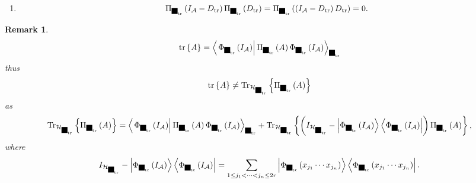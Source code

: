 \documentclass[aps,preprint]{revtex4}%
\providecommand{\U}[1]{\protect\rule{.1in}{.1in}}
\newtheorem{remark}[theorem]{Remark}
\begin{document}
\begin{enumerate}
\item
\begin{equation}
\Pi_{\U{3c6} _{\operatorname*{tr}}}\left(  I_{\mathcal{A}}%
-D_{\operatorname*{tr}}\right)  \Pi_{\U{3c6} _{\operatorname*{tr}}}\left(
D_{\operatorname*{tr}}\right)  =\Pi_{\U{3c6} _{\operatorname*{tr}}}\left(
\left(  I_{\mathcal{A}}-D_{\operatorname*{tr}}\right)  D_{\operatorname*{tr}%
}\right)  =0.
\end{equation}

\end{enumerate}

\begin{remark}%
\begin{equation}
\operatorname*{tr}\left\{  A\right\}  =\left\langle \left.  \Phi_{\U{3c6}
_{\operatorname*{tr}}}\left(  I_{\mathcal{A}}\right)  \right\vert \Pi_{\U{3c6}
_{\operatorname*{tr}}}\left(  A\right)  \Phi_{\U{3c6} _{\operatorname*{tr}}%
}\left(  I_{\mathcal{A}}\right)  \right\rangle _{\U{3c6} _{\operatorname*{tr}%
}}%
\end{equation}
thus
\begin{equation}
\operatorname*{tr}\left\{  A\right\}  \neq\operatorname{Tr}_{\mathcal{H}%
_{\U{3c6} _{\operatorname*{tr}}}}\left\{  \Pi_{\U{3c6} _{\operatorname*{tr}}%
}\left(  A\right)  \right\}
\end{equation}
as
\begin{equation}
\operatorname{Tr}_{\mathcal{H}_{\U{3c6} _{\operatorname*{tr}}}}\left\{
\Pi_{\U{3c6} _{\operatorname*{tr}}}\left(  A\right)  \right\}  =\left\langle
\left.  \Phi_{\U{3c6} _{\operatorname*{tr}}}\left(  I_{\mathcal{A}}\right)
\right\vert \Pi_{\U{3c6} _{\operatorname*{tr}}}\left(  A\right)  \Phi_{\U{3c6}
_{\operatorname*{tr}}}\left(  I_{\mathcal{A}}\right)  \right\rangle _{\U{3c6}
_{\operatorname*{tr}}}+\operatorname{Tr}_{\mathcal{H}_{\U{3c6}
_{\operatorname*{tr}}}}\left\{  \left(  I_{\mathcal{H}_{\U{3c6}
_{\operatorname*{tr}}}}-\left\vert \Phi_{\U{3c6} _{\operatorname*{tr}}}\left(
I_{\mathcal{A}}\right)  \right\rangle \left\langle \Phi_{\U{3c6}
_{\operatorname*{tr}}}\left(  I_{\mathcal{A}}\right)  \right\vert \right)
\Pi_{\U{3c6} _{\operatorname*{tr}}}\left(  A\right)  \right\}  ,
\end{equation}
where
\begin{equation}
I_{\mathcal{H}_{\U{3c6} _{\operatorname*{tr}}}}-\left\vert \Phi_{\U{3c6}
_{\operatorname*{tr}}}\left(  I_{\mathcal{A}}\right)  \right\rangle
\left\langle \Phi_{\U{3c6} _{\operatorname*{tr}}}\left(  I_{\mathcal{A}%
}\right)  \right\vert =\sum_{1\leq j_{1}<\cdots<j_{n}\leq2r}\left\vert
\Phi_{\U{3c6} _{\operatorname*{tr}}}\left(  x_{j_{1}}\cdots x_{j_{n}}\right)
\right\rangle \left\langle \Phi_{\U{3c6} _{\operatorname*{tr}}}\left(
x_{j_{1}}\cdots x_{j_{n}}\right)  \right\vert .
\end{equation}

\end{remark}
\end{document}
